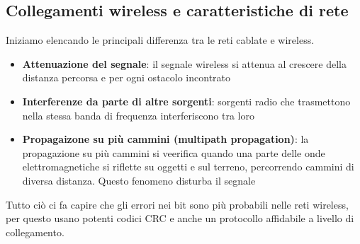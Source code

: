 \documentclass[11pt,a4paper]{article}
\begin{document}
\subsection{Collegamenti wireless e caratteristiche di rete}
Iniziamo elencando le principali differenza tra le reti cablate e wireless.
\begin{itemize}
	\item \textbf{Attenuazione del segnale}: il segnale wireless si attenua al crescere della distanza percorsa e per ogni ostacolo incontrato
	\item \textbf{Interferenze da parte di altre sorgenti}: sorgenti radio che trasmettono nella stessa banda di frequenza interferiscono tra loro
	\item \textbf{Propagaizone su più cammini (multipath propagation)}: la propagazione su più cammini si veerifica quando una parte delle onde elettromagnetiche si riflette su oggetti e sul terreno, percorrendo cammini di diversa distanza. Questo fenomeno disturba il segnale
\end{itemize}

Tutto ciò ci fa capire che gli errori nei bit sono più probabili nelle reti wireless, per questo usano potenti codici CRC e anche un protocollo affidabile a livello di collegamento.
\end{document}
